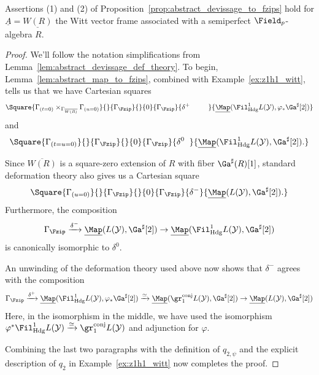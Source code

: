 \documentclass[10pt]{amsart}
\begin{document}
\begin{lemma}
\label{lem:abstract_devissage_witt_vectors}
Assertions (1) and (2) of Proposition~\ref{prop:abstract_devissage_to_fzips} hold for $\underline{A} = \underline{W(R)}$ the Witt vector frame associated with a semiperfect $\Field_p$-algebra $R$.
\end{lemma}
\begin{proof}
We'll follow the notation simplifications from Lemma~\ref{lem:abstract_devissage_def_theory}. To begin, Lemma~\ref{lem:abstract_map_to_fzips}, combined with Example~\ref{ex:z1h1_witt}, tells us that we have Cartesian squares 
\[
\Square{\Gamma_{(t=0)}\times_{\Gamma_{\overline{W(R)}}}\Gamma_{(u=0)}}{}{\Gamma_{\Fzip}}{}{0}{\Gamma_{\Fzip}}{\delta^+\;\qquad\;}{\underline{\Map}(\Fil^1_{\mathrm{Hdg}}L(\mathcal{Y}),\varphi_*\Ga^\sharp[2])}
\]
and
\begin{align*}
\Square{\Gamma_{(t=u=0)}}{}{\Gamma_{\Fzip}}{}{0}{\Gamma_{\Fzip}}{\delta^0\;\;}{\underline{\Map}(\Fil^1_{\mathrm{Hdg}}L(\mathcal{Y}),\Ga^\sharp[2]).}
\end{align*}


Since $\overline{W(R)}$ is a square-zero extension of $R$ with fiber $\Ga^\sharp(R)[1]$, standard deformation theory also gives us a Cartesian square
\[
\Square{\Gamma_{(u=0)}}{}{\Gamma_{\Fzip}}{}{0}{\Gamma_{\Fzip}}{\delta^-}{\underline{\Map}(L(\mathcal{Y}),\Ga^\sharp[2]).}
\]
Furthermore, the composition
\[
\Gamma_{\Fzip}\xrightarrow{\delta^-} \underline{\Map}(L(\mathcal{Y}),\Ga^\sharp[2])\to \underline{\Map}(\Fil^1_{\mathrm{Hdg}}L(\mathcal{Y}),\Ga^\sharp[2])
\]
is canonically isomorphic to $\delta^0$.

An unwinding of the deformation theory used above now shows that $\delta^-$ agrees with the composition
\[
\Gamma_{\Fzip}\xrightarrow{\delta^+}\underline{\Map}(\Fil^1_{\mathrm{Hdg}}L(\mathcal{Y}),\varphi_*\Ga^\sharp[2])\xrightarrow{\simeq}\underline{\Map}(\gr_1^{\mathrm{conj}}L(\mathcal{Y}),\Ga^\sharp[2])\to \underline{\Map}(L(\mathcal{Y}),\Ga^\sharp[2])
\]
Here, in the isomorphism in the middle, we have used the isomorphism $\varphi^*\Fil^1_{\mathrm{Hdg}}L(\mathcal{Y})\xrightarrow{\simeq}\gr^{\mathrm{conj}}_1L(\mathcal{Y})$ and adjunction for $\varphi$. 

Combining the last two paragraphs with the definition of $q_{2,\psi}$ and the explicit description of $q_2$ in Example~\ref{ex:z1h1_witt} now completes the proof.
\end{proof}
\end{document}

